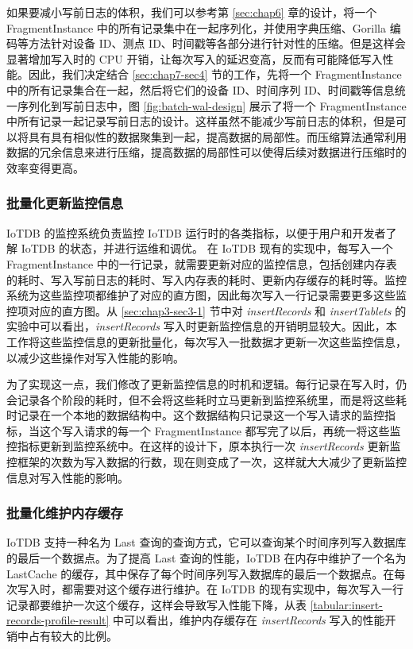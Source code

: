  如果要减小写前日志的体积，我们可以参考第 \ref{sec:chap6} 章的设计，将一个 FragmentInstance 中的所有记录集中在一起序列化，并使用字典压缩、Gorilla 编码等方法针对设备 ID、测点 ID、时间戳等各部分进行针对性的压缩。但是这样会显著增加写入时的 CPU 开销，让每次写入的延迟变高，反而有可能降低写入性能。因此，我们决定结合 \ref{sec:chap7-sec4} 节的工作，先将一个 FragmentInstance 中的所有记录集合在一起，然后将它们的设备 ID、时间序列 ID、时间戳等信息统一序列化到写前日志中，图 \ref{fig:batch-wal-design} 展示了将一个 FragmentInstance 中所有记录一起记录写前日志的设计。这样虽然不能减少写前日志的体积，但是可以将具有具有相似性的数据聚集到一起，提高数据的局部性。而压缩算法通常利用数据的冗余信息来进行压缩，提高数据的局部性可以使得后续对数据进行压缩时的效率变得更高。
\subsubsection{批量化更新监控信息}
 IoTDB 的监控系统负责监控 IoTDB 运行时的各类指标，以便于用户和开发者了解 IoTDB 的状态，并进行运维和调优。
 在 IoTDB 现有的实现中，每写入一个 FragmentInstance 中的一行记录，就需要更新对应的监控信息，包括创建内存表的耗时、写入写前日志的耗时、写入内存表的耗时、更新内存缓存的耗时等。监控系统为这些监控项都维护了对应的直方图，因此每次写入一行记录需要更多这些监控项对应的直方图。从 \ref{sec:chap3-sec3-1} 节中对 \emph{insertRecords} 和 \emph{insertTablets} 的实验中可以看出，\emph{insertRecords} 写入时更新监控信息的开销明显较大。因此，本工作将这些监控信息的更新批量化，每次写入一批数据才更新一次这些监控信息，以减少这些操作对写入性能的影响。

 为了实现这一点，我们修改了更新监控信息的时机和逻辑。每行记录在写入时，仍会记录各个阶段的耗时，但不会将这些耗时立马更新到监控系统里，而是将这些耗时记录在一个本地的数据结构中。这个数据结构只记录这一个写入请求的监控指标，当这个写入请求的每一个 FragmentInstance 都写完了以后，再统一将这些监控指标更新到监控系统中。在这样的设计下，原本执行一次 \emph{insertRecords} 更新监控框架的次数为写入数据的行数，现在则变成了一次，这样就大大减少了更新监控信息对写入性能的影响。

\subsubsection{批量化维护内存缓存}
IoTDB 支持一种名为 Last 查询的查询方式，它可以查询某个时间序列写入数据库的最后一个数据点。为了提高 Last 查询的性能，IoTDB 在内存中维护了一个名为 LastCache 的缓存，其中保存了每个时间序列写入数据库的最后一个数据点。在每次写入时，都需要对这个缓存进行维护。在 IoTDB 的现有实现中，每次写入一行记录都要维护一次这个缓存，这样会导致写入性能下降，从表 \ref{tabular:insert-records-profile-result} 中可以看出，维护内存缓存在 \emph{insertRecords} 写入的性能开销中占有较大的比例。

